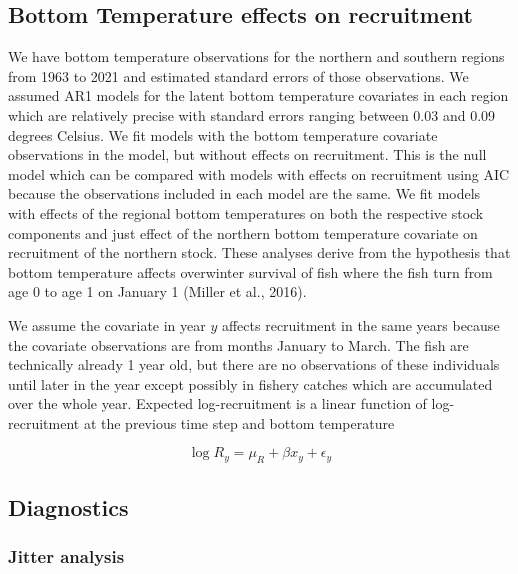 \documentclass[
]{article}
\begin{document}
\hypertarget{bottom-temperature-effects-on-recruitment}{%
\subsection{Bottom Temperature effects on recruitment}\label{bottom-temperature-effects-on-recruitment}}

We have bottom temperature observations for the northern and southern regions from 1963 to 2021 and estimated standard errors of those observations. We assumed AR1 models for the latent bottom temperature covariates in each region which are relatively precise with standard errors ranging between 0.03 and 0.09 degrees Celsius. We fit models with the bottom temperature covariate observations in the model, but without effects on recruitment. This is the null model which can be compared with models with effects on recruitment using AIC because the observations included in each model are the same. We fit models with effects of the regional bottom temperatures on both the respective stock components and just effect of the northern bottom temperature covariate on recruitment of the northern stock. These analyses derive from the hypothesis that bottom temperature affects overwinter survival of fish where the fish turn from age 0 to age 1 on January 1 (Miller et al., 2016).

We assume the covariate in year \(y\) affects recruitment in the same years because the covariate observations are from months January to March. The fish are technically already 1 year old, but there are no observations of these individuals until later in the year except possibly in fishery catches which are accumulated over the whole year. Expected log-recruitment is a linear function of log-recruitment at the previous time step and bottom temperature

\begin{equation}\label{eq:expected-recruitment}
\log R_y = \mu_R + \beta x_y + \epsilon_y
\end{equation}

\hypertarget{diagnostics}{%
\subsection{Diagnostics}\label{diagnostics}}

\hypertarget{jitter-analysis}{%
\subsubsection{Jitter analysis}\label{jitter-analysis}}
\end{document}
